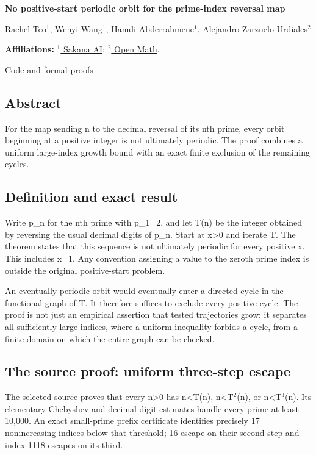 \documentclass[11pt,a4paper]{article}
\begin{document}
{\LARGE\bfseries No positive-start periodic orbit for the prime-index reversal map\par}\medskip
{\small Rachel Teo\ensuremath{^1}, Wenyi Wang\ensuremath{^1}, Hamdi Abderrahmene\ensuremath{^1}, Alejandro Zarzuelo Urdiales\ensuremath{^2}\par}\medskip
{\small\textbf{Affiliations:} \href{https://sakana.ai/}{\ensuremath{^1} Sakana AI}; \href{https://rsihouse.ai/openmath}{\ensuremath{^2} Open Math}.\par}

{\small\href{https://github.com/alejandrozu/openmath-2026-judging}{Code and formal proofs}\par}

\subsection{Abstract}
For the map sending n to the decimal reversal of its nth prime, every orbit beginning at a positive integer is not ultimately periodic. The proof combines a uniform large-index growth bound with an exact finite exclusion of the remaining cycles.

\subsection{Definition and exact result}
Write p\_n for the nth prime with p\_1=2, and let T(n) be the integer obtained by reversing the usual decimal digits of p\_n. Start at x>0 and iterate T. The theorem states that this sequence is not ultimately periodic for every positive x. This includes x=1. Any convention assigning a value to the zeroth prime index is outside the original positive-start problem.

An eventually periodic orbit would eventually enter a directed cycle in the functional graph of T. It therefore suffices to exclude every positive cycle. The proof is not just an empirical assertion that tested trajectories grow: it separates all sufficiently large indices, where a uniform inequality forbids a cycle, from a finite domain on which the entire graph can be checked.

\subsection{The source proof: uniform three-step escape}
The selected source proves that every n>0 has n<T(n), n<T\ensuremath{^2}(n), or n<T\ensuremath{^3}(n). Its elementary Chebyshev and decimal-digit estimates handle every prime at least 10,000. An exact small-prime prefix certificate identifies precisely 17 nonincreasing indices below that threshold; 16 escape on their second step and index 1118 escapes on its third.
\end{document}
